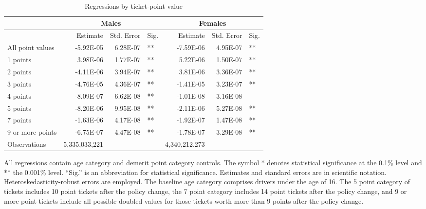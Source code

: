 
\begin{table}%
\centering 
\begin{tabular}{l r r l r r l} 

\hline 
 
 & \multicolumn{3}{c}{Males} & \multicolumn{3}{c}{Females} \\ 

\hline 
 
 & Estimate & Std. Error & Sig. & Estimate & Std. Error & Sig. \\ 

\hline 
 
All point values                &  -5.92E-05        &  6.28E-07       &   **       &  -7.59E-06        &  4.95E-07       &   **       \\ 
1 points                        &  3.98E-06        &  1.77E-07       &   **       &  5.22E-06        &  1.50E-07       &   **       \\ 
2 points                        &  -4.11E-06        &  3.94E-07       &   **       &  3.81E-06        &  3.36E-07       &   **       \\ 
3 points                        &  -4.76E-05        &  4.36E-07       &   **       &  -1.41E-05        &  3.23E-07       &   **       \\ 
4 points                        &  -8.09E-07        &  6.62E-08       &   **       &  -1.01E-08        &  3.16E-08       &            \\ 
5 points                        &  -8.20E-06        &  9.95E-08       &   **       &  -2.11E-06        &  5.27E-08       &   **       \\ 
7 points                        &  -1.63E-06        &  4.17E-08       &   **       &  -1.92E-07        &  1.47E-08       &   **       \\ 
9 or more points                &  -6.75E-07        &  4.47E-08       &   **       &  -1.78E-07        &  3.29E-08       &   **       \\ 
Observations            & 5,335,033,221    &          &              &  4,340,212,273 \\ 


\hline 

\end{tabular} 
\caption{Regressions by ticket-point value} 
All regressions contain age category and demerit point category controls. 
The symbol * denotes statistical significance at the 0.1\% level 
and ** the 0.001\% level. 
``Sig.'' is an abbreviation for statistical significance. 
Estimates and standard errors are in scientific notation. 
Heteroskedasticity-robust errors are employed. 
The baseline age category comprises drivers under the age of 16. 
The 5 point category of tickets includes 10 point tickets after the policy change,  
the 7 point category includes 14 point tickets after the policy change,  
and 9 or more point tickets include all possible doubled values for those tickets  
worth more than 9 points after the policy change. 
\label{tab:orig_regs_by_points} 
\end{table} 
 
